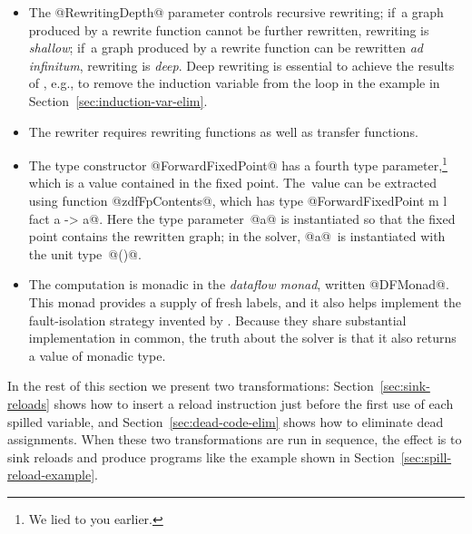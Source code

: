 \documentclass[blockstyle,preprint,nocopyrightspace]{sigplanconf}
\newcommand\secref[1]{Section~\ref{sec:#1}}
\begin{document}
\begin{itemize}
\item
The @RewritingDepth@ parameter controls recursive rewriting;
if~a graph produced by a rewrite function cannot be further rewritten,
rewriting is \emph{shallow};
if~a graph produced by a rewrite function can be rewritten \emph{ad
infinitum}, rewriting is \emph{deep}.
Deep rewriting is essential to achieve the results of
\citet{lerner-grove-chambers:2002}, e.g., to remove the induction
variable from the loop in the example in \secref{induction-var-elim}.
\item
The rewriter requires rewriting functions as well as transfer
functions.
\item
The type constructor @ForwardFixedPoint@ has a fourth
type parameter,\footnote
{We lied to you earlier.}
which is a value contained in the fixed point.
The~value can be extracted using function @zdfFpContents@, which has
type @ForwardFixedPoint m l fact a -> a@.
Here the type parameter~@a@ is instantiated so that the fixed point
contains the rewritten graph;
in the solver, @a@~is instantiated with
the unit type~@()@.
\item
The computation is monadic in the \emph{dataflow monad}, written
@DFMonad@.
This monad provides a supply of fresh labels, and it
also helps implement the fault-isolation strategy invented by
\citet{whalley:isolation}.
Because they share substantial implementation in common, the truth
about the solver is that it also returns a value of monadic type.
\end{itemize}

In the rest of this section we present two transformations:
\secref{sink-reloads} shows how to insert a reload instruction just
before the first use of each spilled variable, and
\secref{dead-code-elim} shows how to eliminate dead assignments.
When these two transformations are run in sequence, the effect is to
sink reloads and produce programs like the example shown in
\secref{spill-reload-example}. 
\end{document}
